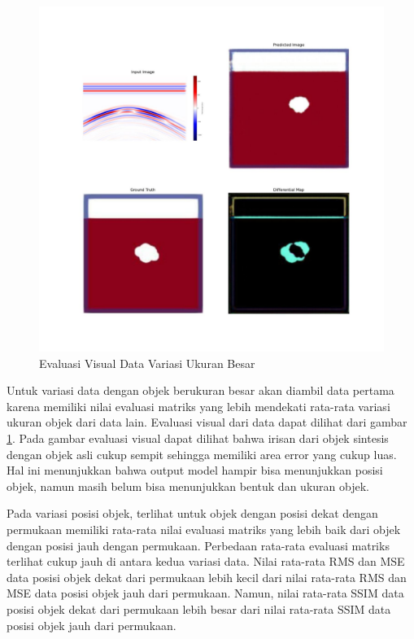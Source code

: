 \begin{figure}[ht]
  \centering
  \includegraphics[scale=0.15]{gambar/diffMapBesar.jpg}
  \caption{Evaluasi Visual Data Variasi Ukuran Besar}
  \label{fig:diffmapbesar}
\end{figure}

Untuk variasi data dengan objek berukuran besar akan diambil data pertama karena memiliki nilai evaluasi matriks yang lebih mendekati rata-rata variasi ukuran objek dari data lain. 
Evaluasi visual dari data dapat dilihat dari gambar \ref{fig:diffmapbesar}. 
Pada gambar evaluasi visual dapat dilihat bahwa irisan dari objek sintesis dengan objek asli cukup sempit sehingga memiliki area error yang cukup luas. 
Hal ini menunjukkan bahwa output model hampir bisa menunjukkan posisi objek, namun masih belum bisa menunjukkan bentuk dan ukuran objek.

Pada variasi posisi objek, terlihat untuk objek dengan posisi dekat dengan permukaan memiliki rata-rata nilai evaluasi matriks yang lebih baik dari objek dengan posisi jauh dengan permukaan.
Perbedaan rata-rata evaluasi matriks terlihat cukup jauh di antara kedua variasi data. 
Nilai rata-rata RMS dan MSE data posisi objek dekat dari permukaan lebih kecil dari nilai rata-rata RMS dan MSE data posisi objek jauh dari permukaan. 
Namun, nilai rata-rata SSIM data posisi objek dekat dari permukaan lebih besar dari nilai rata-rata SSIM data posisi objek jauh dari permukaan. 

